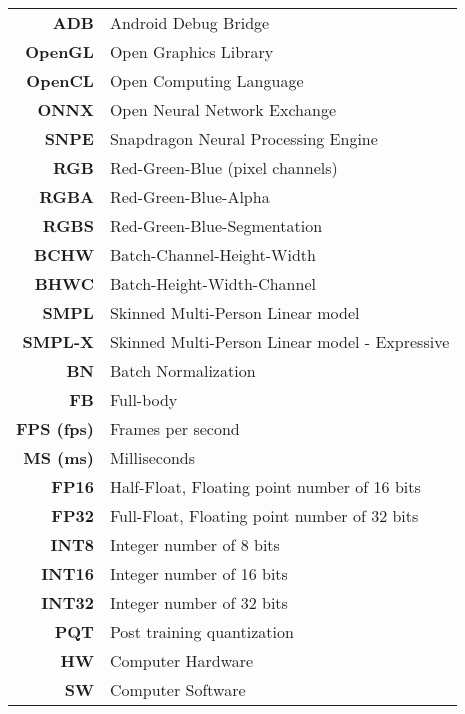 \begin{table}[!ht]
\begin{tabular}{>{\bf}r l}
		ADB & Android Debug Bridge \\
		OpenGL & Open Graphics Library \\
		OpenCL & Open Computing Language \\
		ONNX & Open Neural Network Exchange \\
		SNPE & Snapdragon Neural Processing Engine \\
		RGB & Red-Green-Blue (pixel channels) \\
		RGBA & Red-Green-Blue-Alpha \\
		RGBS & Red-Green-Blue-Segmentation \\
		BCHW & Batch-Channel-Height-Width \\
		BHWC & Batch-Height-Width-Channel \\
		SMPL & Skinned Multi-Person Linear model \cite{dnn:smpl15} \\
		SMPL-X & Skinned Multi-Person Linear model - Expressive \cite{dnn:smplx19}\\
		BN & Batch Normalization \\
		FB & Full-body \\
		FPS (fps) & Frames per second\\
		MS (ms) & Milliseconds \\
		FP16 & Half-Float, Floating point number of 16 bits \\
		FP32 & Full-Float, Floating point number of 32 bits \\
		INT8 & Integer number of 8 bits \\
		INT16 & Integer number of 16 bits \\
		INT32 & Integer number of 32 bits \\
		PQT & Post training quantization \\
		HW & Computer Hardware \\
		SW & Computer Software \\
	\end{tabular}
\end{table}